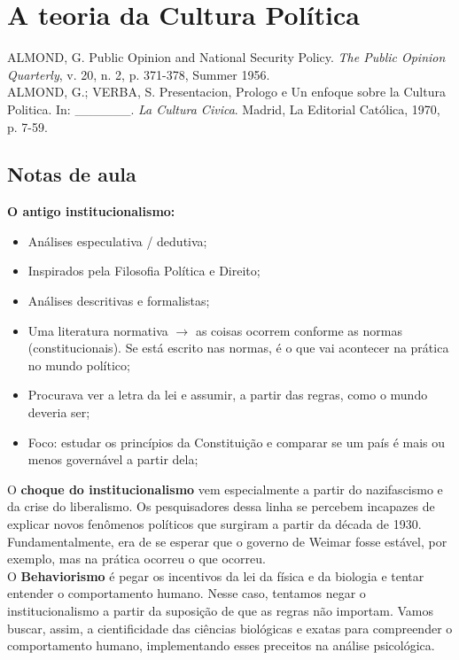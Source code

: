 \section{A teoria da Cultura Política}

ALMOND, G. Public Opinion and National Security Policy. \textit{The Public Opinion Quarterly}, v. 20, n. 2, p. 371-378, Summer 1956. \\

\noindent ALMOND, G.; VERBA, S. Presentacion, Prologo e Un enfoque sobre la Cultura Politica. In: \_\_\_\_\_\_. \textit{La Cultura Civica}. Madrid, La Editorial Católica, 1970, p. 7-59. 


\subsection{Notas de aula}

\textbf{O antigo institucionalismo:}

\begin{itemize}

\item Análises especulativa / dedutiva;
\item Inspirados pela Filosofia Política e Direito;
\item Análises descritivas e formalistas;
\item Uma literatura normativa $\rightarrow$ as coisas ocorrem conforme as normas (constitucionais). Se está escrito nas normas, é o que vai acontecer na prática no mundo político;
\item Procurava ver a letra da lei e assumir, a partir das regras, como o mundo deveria ser;
\item Foco: estudar os princípios da Constituição e comparar se um país é mais ou menos governável a partir dela;

\end{itemize}

\noindent O \textbf{choque do institucionalismo} vem especialmente a partir do nazifascismo e da crise do liberalismo. Os pesquisadores dessa linha se percebem incapazes de explicar novos fenômenos políticos que surgiram a partir da década de 1930. Fundamentalmente, era de se esperar que o governo de Weimar fosse estável, por exemplo, mas na prática ocorreu o que ocorreu. \\

\noindent O \textbf{Behaviorismo} é pegar os incentivos da lei da física e da biologia e tentar entender o comportamento humano. Nesse caso, tentamos negar o institucionalismo a partir da suposição de que as regras não importam. Vamos buscar, assim, a cientificidade das ciências biológicas e exatas para compreender o comportamento humano, implementando esses preceitos na análise psicológica. \\

